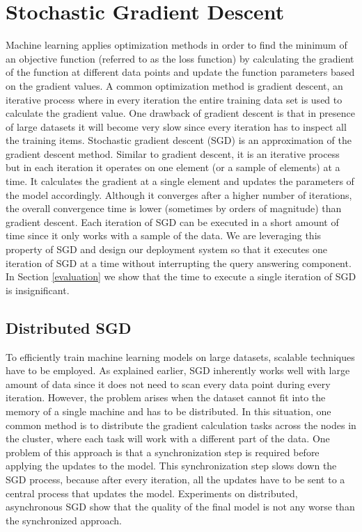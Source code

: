 \documentclass{vldb}
\begin{document}
\section{Stochastic Gradient Descent} \label{sgd}
Machine learning applies optimization methods in order to find the minimum of an objective function (referred to as the loss function) by calculating the gradient of the function at different data points and update the function parameters based on the gradient values.
A common optimization method is gradient descent, an iterative process where in every iteration the entire training data set is used to calculate the gradient value.
One drawback of gradient descent is that in presence of large datasets it will become very slow since every iteration has to inspect all the training items.
Stochastic gradient descent (SGD) \cite{bottou2010large} is an approximation of the gradient descent method. 
Similar to gradient descent, it is an iterative process but in each iteration it operates on one element (or a sample of elements) at a time. 
It calculates the gradient at a single element and updates the parameters of the model accordingly. 
Although it converges after a higher number of iterations, the overall convergence time is lower (sometimes by orders of magnitude) than gradient descent. 
Each iteration of SGD can be executed in a short amount of time since it only works with a sample of the data.
We are leveraging this property of SGD and design our deployment system so that it executes one iteration of SGD at a time without interrupting the query answering component.
In Section \ref{evaluation} we show that the time to execute a single iteration of SGD is insignificant.

\subsection{Distributed SGD}
To efficiently train machine learning models on large datasets, scalable techniques have to be employed.
As explained earlier, SGD inherently works well with large amount of data since it does not need to scan every data point during every iteration.
However, the problem arises when the dataset cannot fit into the memory of a single machine and has to be distributed.
In this situation, one common method is to distribute the gradient calculation tasks across the nodes in the cluster, where each task will work with a different part of the data.
One problem of this approach is that a synchronization step is required before applying the updates to the model. 
This synchronization step slows down the SGD process, because after every iteration, all the updates have to be sent to a central process that updates the model.
Experiments on distributed, asynchronous SGD \cite{recht2011hogwild, dean2012large} show that the quality of the final model is not any worse than the synchronized approach. 
\end{document}
